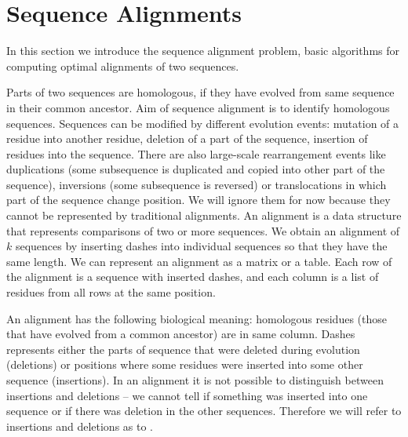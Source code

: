 \section{Sequence Alignments}

In this section we introduce the sequence alignment problem, basic algorithms
for computing optimal alignments of two sequences.

Parts of two sequences are homologous, if they have evolved from same sequence
in their common ancestor. Aim of sequence alignment is to identify homologous
sequences. Sequences can be modified by different evolution events:
mutation of a residue into another residue, deletion of a part of the sequence,
insertion of residues into the sequence. There are also large-scale
rearrangement events like duplications (some subsequence is duplicated and
copied into other part of the sequence), inversions (some subsequence is
reversed) or translocations in which part of the sequence change position.  We will
ignore them for now because they cannot be represented by traditional
alignments. An alignment is a data structure that represents comparisons of two
or more sequences. We obtain an alignment of $k$ sequences by inserting dashes
into individual sequences so that they have the same length. We can represent an
alignment as a matrix or a table. Each row of the alignment is a sequence with
inserted dashes, and each column is a list of residues from all rows at the same
position.


An alignment has the following biological meaning: homologous residues (those that
have evolved from a common ancestor) are in same column. Dashes represents
either the parts of sequence that were deleted during evolution (deletions) or
positions where some residues were inserted into some other sequence
(insertions). In an alignment it is not possible to distinguish between insertions and
deletions -- we cannot tell if something was inserted into one sequence or if
there was deletion in the other sequences. Therefore we will refer to insertions
and deletions as to .


